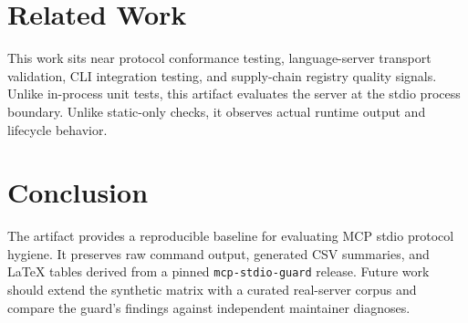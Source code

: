 \documentclass[10pt]{article}
\begin{document}
\section{Related Work}

This work sits near protocol conformance testing, language-server transport
validation, CLI integration testing, and supply-chain registry quality signals.
Unlike in-process unit tests, this artifact evaluates the server at the stdio
process boundary. Unlike static-only checks, it observes actual runtime output
and lifecycle behavior.

\section{Conclusion}

The artifact provides a reproducible baseline for evaluating MCP stdio protocol
hygiene. It preserves raw command output, generated CSV summaries, and LaTeX
tables derived from a pinned \texttt{mcp-stdio-guard} release. Future work should
extend the synthetic matrix with a curated real-server corpus and compare the
guard's findings against independent maintainer diagnoses.



\end{document}
